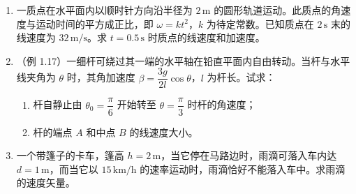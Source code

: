 \documentclass{ctexart}
\begin{document}
\begin{enumerate}
\item 一质点在水平面内以顺时针方向沿半径为 $2\,\text{m}$ 的圆形轨道运动。此质点的角速度与运动时间的平方成正比，即 $\omega = kt^{2}$，$k$ 为待定常数。已知质点在 $2\,\text{s}$ 末的线速度为 $32\,\text{m/s}$。求 $t = 0.5\,\text{s}$ 时质点的线速度和加速度。

\item（例 1.17）一细杆可绕过其一端的水平轴在铅直平面内自由转动。当杆与水平线夹角为 $\theta$ 时，其角加速度 $\beta = \dfrac{3g}{2l}\cos\theta$，$l$ 为杆长。试求：
\begin{enumerate}
  \item 杆自静止由 $\theta_0 = \dfrac{\pi}{6}$ 开始转至 $\theta = \dfrac{\pi}{3}$ 时杆的角速度；
  \item 杆的端点 $A$ 和中点 $B$ 的线速度大小。
\end{enumerate}

\item 一个带篷子的卡车，篷高 $h = 2\,\text{m}$，当它停在马路边时，雨滴可落入车内达 $d = 1\,\text{m}$，而当它以 $15\,\text{km/h}$ 的速率运动时，雨滴恰好不能落入车中。求雨滴的速度矢量。

\end{enumerate}
\end{document}
